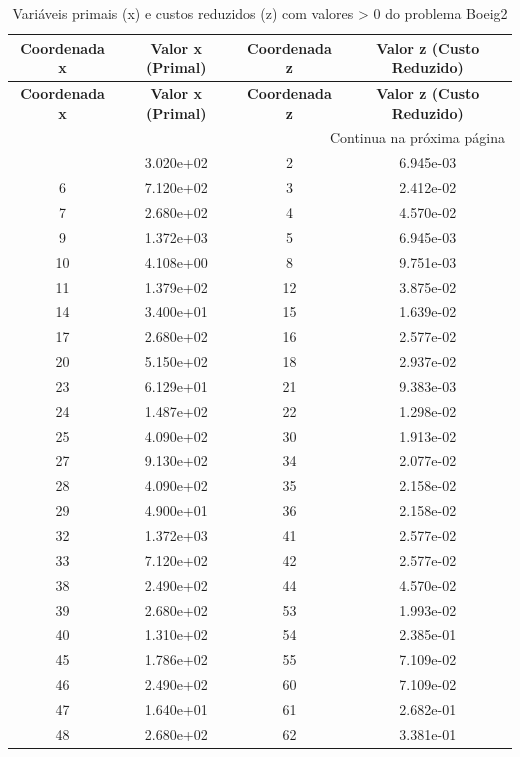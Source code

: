 \documentclass[12pt]{article}
\begin{document}
\begin{longtable}{@{}cccc@{}}
\caption{Variáveis primais (x) e custos reduzidos (z) com valores > 0 do problema Boeig2} \\
\toprule
\textbf{Coordenada x} & \textbf{Valor x (Primal)} & \textbf{Coordenada z} & \textbf{Valor z (Custo Reduzido)} \\
\midrule
\endfirsthead

\toprule
\textbf{Coordenada x} & \textbf{Valor x (Primal)} & \textbf{Coordenada z} & \textbf{Valor z (Custo Reduzido)} \\
\midrule
\endhead

\midrule \multicolumn{4}{r}{{Continua na próxima página}} \\ \midrule
\endfoot

\bottomrule
\endlastfoot
1 & 3.020e+02 & 2 & 6.945e-03 \\
6 & 7.120e+02 & 3 & 2.412e-02 \\
7 & 2.680e+02 & 4 & 4.570e-02 \\
9 & 1.372e+03 & 5 & 6.945e-03 \\
10 & 4.108e+00 & 8 & 9.751e-03 \\
11 & 1.379e+02 & 12 & 3.875e-02 \\
14 & 3.400e+01 & 15 & 1.639e-02 \\
17 & 2.680e+02 & 16 & 2.577e-02 \\
20 & 5.150e+02 & 18 & 2.937e-02 \\
23 & 6.129e+01 & 21 & 9.383e-03 \\
24 & 1.487e+02 & 22 & 1.298e-02 \\
25 & 4.090e+02 & 30 & 1.913e-02 \\
27 & 9.130e+02 & 34 & 2.077e-02 \\
28 & 4.090e+02 & 35 & 2.158e-02 \\
29 & 4.900e+01 & 36 & 2.158e-02 \\
32 & 1.372e+03 & 41 & 2.577e-02 \\
33 & 7.120e+02 & 42 & 2.577e-02 \\
38 & 2.490e+02 & 44 & 4.570e-02 \\
39 & 2.680e+02 & 53 & 1.993e-02 \\
40 & 1.310e+02 & 54 & 2.385e-01 \\
45 & 1.786e+02 & 55 & 7.109e-02 \\
46 & 2.490e+02 & 60 & 7.109e-02 \\
47 & 1.640e+01 & 61 & 2.682e-01 \\
48 & 2.680e+02 & 62 & 3.381e-01 \\

\end{longtable}
\end{document}
